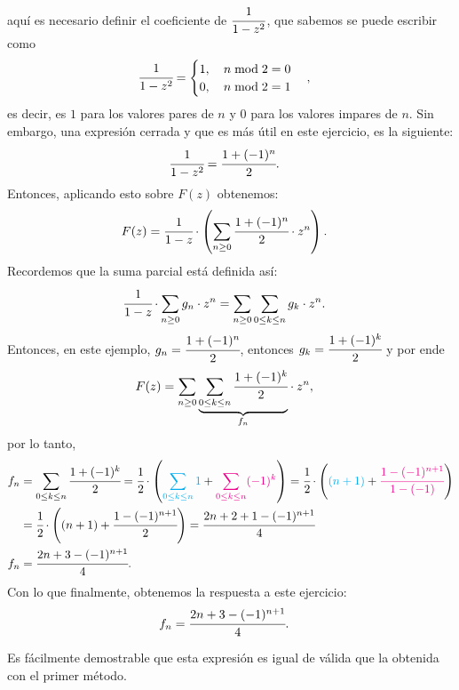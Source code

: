 aquí es necesario definir el coeficiente de $\cfrac{1}{1-z^2}$, que sabemos se puede escribir como
\begin{align*}
[z^n]\cfrac{1}{1-z^2}&=\begin{cases}
1,\quad n\bmod 2 =0\\
0,\quad n\bmod 2 =1
\end{cases},
\end{align*}
es decir, es $1$ para los valores pares de $n$ y 0 para los valores impares de $n$.
Sin embargo, una expresión cerrada y que es más útil en este ejercicio, es la siguiente:
\begin{align*}
[z^n]\cfrac{1}{1-z^2}&=\cfrac{1+(-1)^n}{2}.
\end{align*}
Entonces, aplicando esto sobre $F(z)$ obtenemos:
\begin{align*}
F(z)&=\cfrac{1}{1-z}\cdot\left(\sum_{n\geq0}{\cfrac{1+(-1)^n}{2}\cdot z^n}\right).
\end{align*}
Recordemos que la suma parcial está definida así:
\begin{align*}
\cfrac{1}{1-z}\cdot\sum_{n\geq0}{g_n\cdot z^n}&=\sum_{n\geq0}{\sum_{0\leq k \leq n}{g_k}\cdot z^n}.
\end{align*}
Entonces, en este ejemplo, $g_n=\cfrac{1+(-1)^n}{2}$, entonces $g_k=\cfrac{1+(-1)^k}{2}$ y por ende
\begin{align*}
F(z)&=\sum_{n\geq0}{\underset{f_n}{\underbrace{\sum_{0\leq k \leq n}{\cfrac{1+(-1)^k}{2}}}}\cdot z^n},
\end{align*}
por lo tanto,
\begin{align*}
f_n&=\sum_{0\leq k\leq n}{\cfrac{1+(-1)^k}{2}}=\cfrac{1}{2}\cdot\left({\color{cyan}\sum_{0\leq k\leq n}1} + {\color{magenta}\sum_{0\leq k\leq n}(-1)^k}\right)=\cfrac{1}{2}\cdot\left({\color{cyan}(n+1)}+{\color{magenta}\cfrac{1-(-1)^{n+1}}{1-(-1)}}\right)\\
&=\cfrac{1}{2}\cdot\left((n+1)+\cfrac{1-(-1)^{n+1}}{2}\right)=\cfrac{2n+2+1-(-1)^{n+1}}{4}\\
f_n&=\cfrac{2n+3-(-1)^{n+1}}{4}.
\end{align*}
Con lo que finalmente, obtenemos la respuesta a este ejercicio:
\begin{align*}
f_n&=\cfrac{2n+3-(-1)^{n+1}}{4}.
\end{align*}

Es fácilmente demostrable que esta expresión es igual de válida que la obtenida con el primer método.

